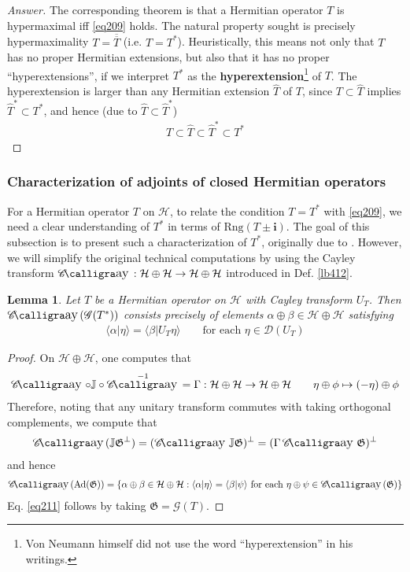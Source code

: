 \documentclass[12pt,b5paper,notitlepage]{article}
\theoremstyle{definition}
\theoremstyle{plain}
\newtheorem{lm}[df]{Lemma}
\DeclareMathOperator{\Cay}{\mathscr{C}\text{\kern -3pt {\calligra\large ay}}\,}
\newcommand{\fk}{\mathfrak}
\newcommand{\wht}{\widehat}
\newcommand{\ovl}{\overline}
\newcommand{\Dom}{\mathscr{D}}
\newcommand{\bk}[1]{\langle {#1}\rangle}
\newcommand{\Ad}{\mathrm{Ad}}
\newcommand{\im}{\mathbf{i}}
\newcommand{\Jbb}{\mathbb J}
\newcommand{\Rng}{\mathrm{Rng}}
\newcommand{\MH}{\mathcal H}
\newcommand{\SG}{\mathscr G}
\numberwithin{equation}{section}
\begin{document}
\begin{proof}[Answer]
The corresponding theorem is that a Hermitian operator $T$ is hypermaximal iff \eqref{eq209} holds. The natural property sought is precisely hypermaximality $T=\ovl{\ovl T}$ (i.e. $T=T^*$). Heuristically, this means not only that $T$ has no proper Hermitian extensions, but also that it has no proper ``hyperextensions'', if we interpret $T^*$ as the \textbf{hyperextension}\footnote{Von Neumann himself did not use the word ``hyperextension'' in his writings.} of $T$. The hyperextension is larger than any Hermitian extension $\wht T$ of $T$, since $T\subset\wht T$ implies $\wht T^*\subset T^*$, and hence (due to $\wht T\subset\wht T^*$)
\begin{align}
T\subset\wht T\subset\wht T^*\subset T^*
\end{align}
\end{proof}


 
\subsubsection{Characterization of adjoints of closed Hermitian operators}

For a Hermitian operator $T$ on $\MH$, to relate the condition $T=T^*$ with \eqref{eq209}, we need a clear understanding of $T^*$ in terms of $\Rng(T\pm\im)$. The goal of this subsection is to present such a characterization of $T^*$, originally due to \cite{vN29a}. However, we will simplify the original technical computations by using the Cayley transform $\Cay:\MH\oplus\MH\rightarrow\MH\oplus\MH$ introduced in Def. \ref{lb412}.


\begin{lm}\label{lb413}
Let $T$ be a Hermitian operator on $\MH$ with Cayley transform $U_T$. Then $\Cay(\SG(T^*))$ consists precisely of elements $\alpha\oplus\beta\in\MH\oplus\MH$ satisfying
\begin{align}\label{eq211}
\bk{\alpha|\eta}=\bk{\beta|U_T\eta}\qquad\text{for each }\eta\in\Dom(U_T)
\end{align}
\end{lm}


\begin{proof}
On $\MH\oplus\MH$, one computes that
\begin{align*}
\Cay\circ\Jbb\circ\Cay^{-1}=\Gamma:\MH\oplus\MH\rightarrow\MH\oplus\MH\qquad \eta\oplus\phi\mapsto(-\eta)\oplus\phi
\end{align*}
Therefore, noting that any unitary transform commutes with taking orthogonal complements, we compute that
\begin{align*}
\Cay(\Jbb\fk G^\perp)=(\Cay\Jbb\fk G)^\perp=(\Gamma\Cay\fk G)^\perp
\end{align*}
and hence
\begin{align}
\Cay(\Ad(\fk G))=\{\alpha\oplus\beta\in\MH\oplus\MH:\bk{\alpha|\eta}=\bk{\beta|\psi}\text{ for each }\eta\oplus\psi\in\Cay(\fk G)\}
\end{align}
Eq. \eqref{eq211} follows by taking $\fk G=\SG(T)$.
\end{proof}
\end{document}
